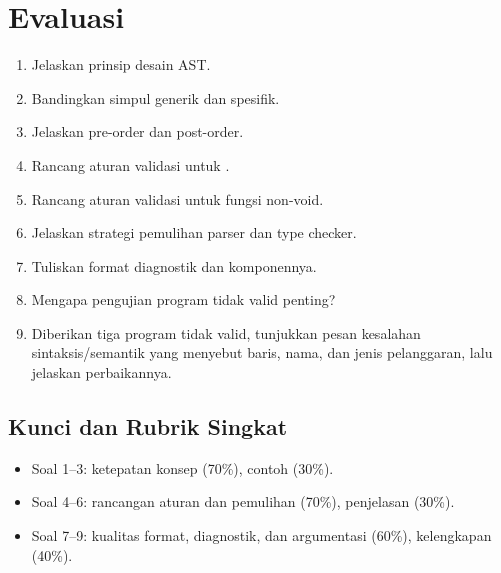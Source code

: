 \section*{Evaluasi}

\begin{enumerate}[label=\arabic*.,leftmargin=*]
  \item Jelaskan prinsip desain AST.
  \item Bandingkan simpul generik dan spesifik.
  \item Jelaskan pre-order dan post-order.
  \item Rancang aturan validasi untuk .
  \item Rancang aturan validasi untuk fungsi non-void.
  \item Jelaskan strategi pemulihan parser dan type checker.
  \item Tuliskan format diagnostik dan komponennya.
  \item Mengapa pengujian program tidak valid penting?
  \item Diberikan tiga program tidak valid, tunjukkan pesan kesalahan
        sintaksis/semantik yang menyebut baris, nama, dan jenis
        pelanggaran, lalu jelaskan perbaikannya.
\end{enumerate}

\subsection*{Kunci dan Rubrik Singkat}
\begin{itemize}[leftmargin=*]
  \item Soal 1--3: ketepatan konsep (70\%), contoh (30\%).
  \item Soal 4--6: rancangan aturan dan pemulihan (70\%),
        penjelasan (30\%).
  \item Soal 7--9: kualitas format, diagnostik, dan argumentasi
        (60\%), kelengkapan (40\%).
\end{itemize}
